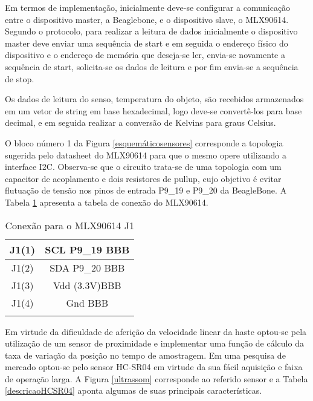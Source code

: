	Em termos de implementação, inicialmente deve-se configurar a comunicação entre o dispositivo master, a Beaglebone, e o dispositivo slave, o MLX90614. Segundo o protocolo, para realizar a leitura de dados inicialmente o dispositivo master deve enviar uma sequência de start e em seguida o endereço físico do dispositivo e o endereço de memória que deseja-se ler, envia-se novamente a sequência de start, solicita-se os dados de leitura e por fim envia-se a sequência de stop. 

	Os dados de leitura do senso, temperatura do objeto, são recebidos armazenados em um vetor de string em base hexadecimal, logo deve-se convertê-los para base decimal, e em seguida realizar a conversão de Kelvins para graus Celsius. 

	O bloco número 1 da Figura \ref{esquemáticosensores} corresponde a topologia sugerida pelo datasheet do MLX90614 para que o mesmo opere utilizando a interface I2C. Observa-se que o circuito trata-se de uma topologia com um capacitor de acoplamento e dois resistores de pullup, cujo objetivo é evitar flutuação de tensão nos pinos de entrada P9\_19 e P9\_20 da BeagleBone. A Tabela \ref{conexaotemperatura} apresenta a tabela de conexão do MLX90614.

	\begin{table}[!h]
	\centering
	\caption{Conexão para o MLX90614 J1}
	\vspace{0.5cm}
	\begin{tabular}{c c}
	\hline
	J1(1)			&	SCL P9\_19 BBB\\
	\hline
	J1(2)			&	SDA P9\_20 BBB\\
	\hline
	J1(3)			&	Vdd (3.3V)BBB\\
	\hline
	J1(4)			&	Gnd BBB\\
	\hline
	\label{conexaotemperatura}
	\end{tabular}
	\end{table}



	Em virtude da dificuldade de aferição da velocidade linear da haste optou-se pela utilização de um sensor de proximidade e implementar uma função de cálculo da taxa de variação da posição no tempo de amostragem. Em uma pesquisa de mercado optou-se pelo sensor HC-SR04 em virtude da sua fácil aquisição e faixa de operação larga. A Figura \ref{ultrassom} corresponde ao referido sensor e a Tabela \ref{descricaoHCSR04} aponta algumas de suas principais características.
	
